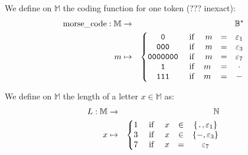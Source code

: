 \documentclass[a4paper]{report}
\newenvironment{definition}[1][Definition.]{\begin{trivlist}
\item[\hskip \labelsep {\bfseries #1}]}{\end{trivlist}}
\begin{document}
\begin{definition}
  We define on $\mathbb{M}$ the coding function for one token (??? inexact):
  \begin{eqnarray*}
    \operatorname{morse\_code} : \mathbb{M} &\rightarrow& \mathbb{B^{*}}\\
                 m &\mapsto&
                 \left\{\begin{matrix}
                        \texttt{0} \ &\textup{if}& \ m &=& \varepsilon_1 \\ 
                        \texttt{000} \ &\textup{if}& \ m &=& \varepsilon_3 \\
                        \texttt{0000000} \ &\textup{if}& \ m &=& \varepsilon_7 \\
                        \texttt{1} \ &\textup{if}& m &=& \cdot\\
                        \texttt{111} \ &\textup{if}& m &=& -
                        \end{matrix}\right.
  \end{eqnarray*}
\end{definition}

\begin{definition}
  We define on $\mathbb{M}$ the length of a letter $x \in \mathbb{M}$ as:
\begin{eqnarray*}
  L : \mathbb{M} &\rightarrow& \mathbb{N}\\
              x  &\mapsto&
                 \left\{\begin{matrix}
                 1 \ &\textup{if }& x &\in& \left \{ \texttt{.}, \varepsilon_1 \right \} \\
                 3 \ &\textup{if }& x &\in& \left \{ -, \varepsilon_3 \right \} \\ 
                 7 \ &\textup{if }& x &=& \varepsilon_7
              \end{matrix}\right.
\end{eqnarray*}
\end{definition}
\end{document}
